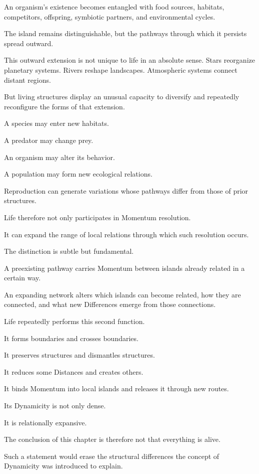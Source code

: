 An organism’s existence becomes entangled with food sources, habitats, competitors, offspring, symbiotic partners, and environmental cycles.

The island remains distinguishable, but the pathways through which it persists spread outward.

This outward extension is not unique to life in an absolute sense. Stars reorganize planetary systems. Rivers reshape landscapes. Atmospheric systems connect distant regions.

But living structures display an unusual capacity to diversify and repeatedly reconfigure the forms of that extension.

A species may enter new habitats.

A predator may change prey.

An organism may alter its behavior.

A population may form new ecological relations.

Reproduction can generate variations whose pathways differ from those of prior structures.

Life therefore not only participates in Momentum resolution.

It can expand the range of local relations through which such resolution occurs.

The distinction is subtle but fundamental.

A preexisting pathway carries Momentum between islands already related in a certain way.

An expanding network alters which islands can become related, how they are connected, and what new Differences emerge from those connections.

Life repeatedly performs this second function.

It forms boundaries and crosses boundaries.

It preserves structures and dismantles structures.

It reduces some Distances and creates others.

It binds Momentum into local islands and releases it through new routes.

Its Dynamicity is not only dense.

It is relationally expansive.

The conclusion of this chapter is therefore not that everything is alive.

Such a statement would erase the structural differences the concept of Dynamicity was introduced to explain.

